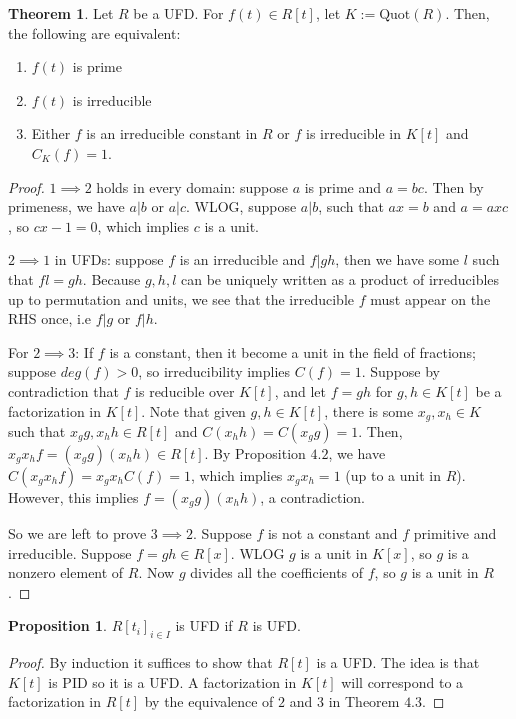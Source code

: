 \documentclass{article}
\theoremstyle{definition}
\newtheorem{theorem}{Theorem}[section]
\theoremstyle{definition}
\theoremstyle{definition}
\newtheorem{proposition}{Proposition}[section]
\theoremstyle{definition}
\theoremstyle{definition}
\theoremstyle{definition}
\theoremstyle{definition}
\begin{document}
\begin{tcolorbox}[colback=red!5!white,colframe=red!30!white]
\begin{theorem}
    Let $R$ be a UFD. For $f(t)\in R[t]$, let $K:=\textrm{Quot}(R)$. Then, the following are equivalent: 
    \begin{enumerate}
        \item $f(t)$ is prime
        \item  $f(t)$ is irreducible
        \item  Either $f$ is an irreducible constant in $R$ or $f$ is irreducible in $K[t]$ and $C_K(f)=1$. 
    \end{enumerate} 
\end{theorem}
\end{tcolorbox}

\begin{proof}
    $1 \implies 2$ holds in every domain: suppose $a$ is prime and $a=bc$. Then by primeness, we have $a|b$ or $a|c$. WLOG, suppose $a|b$, such that $ax=b$ and $a=axc$, so $cx-1=0$, which implies $c$ is a unit. 

    $2 \implies 1$ in UFDs: suppose $f$ is an irreducible and $f|gh$, then we have some $l$ such that $fl=gh$. Because $g,h,l$ can be uniquely written as a product of irreducibles up to permutation and units, we see that the irreducible $f$ must appear on the RHS once, i.e $f|g$ or $f|h$. 

    For $2\implies 3$:  If $f$ is a constant, then it become a unit in the field of fractions; suppose $deg(f)>0$, so irreducibility implies $C(f)=1$. Suppose by contradiction that $f$ is reducible over $K[t]$, and let $f=gh$ for $g,h\in K[t]$ be a factorization in $K[t]$. Note that given $g,h\in K[t]$, there is some $x_g,x_h\in K$ such that $x_gg,x_hh\in R[t]$ and $C(x_hh)=C(x_gg)=1$. Then, $x_gx_hf=(x_gg)(x_hh)\in R[t]$. By Proposition $4.2$, we have $C(x_gx_hf)=x_gx_hC(f)=1$, which implies $x_gx_h=1$ (up to a unit in $R$). However, this implies $f=(x_gg)(x_hh)$, a contradiction. 
    
    So we are left to prove $3\implies 2$. Suppose $f$ is not a constant and $f$ primitive and irreducible. Suppose $f = gh \in R[x]$. WLOG $g$ is a unit in $K[x]$, so $g$ is a nonzero element of $R$. Now $g$ divides all the coefficients of $f$, so $g$ is a unit in $R$. 
\end{proof}
 

\begin{tcolorbox}[colback=blue!5!white,colframe=blue!30!white]
\begin{proposition}
$R[t_i]_{i\in I}$ is UFD if $R$ is UFD.
\end{proposition}
\end{tcolorbox}
\begin{proof}
   By induction it suffices to show that $R[t]$ is a UFD. The idea is that $K[t]$ is PID so it is a UFD. A factorization in $K[t]$ will correspond to a factorization in $R[t]$ by the equivalence of $2$ and $3$ in Theorem $4.3$.
\end{proof}
\end{document}
